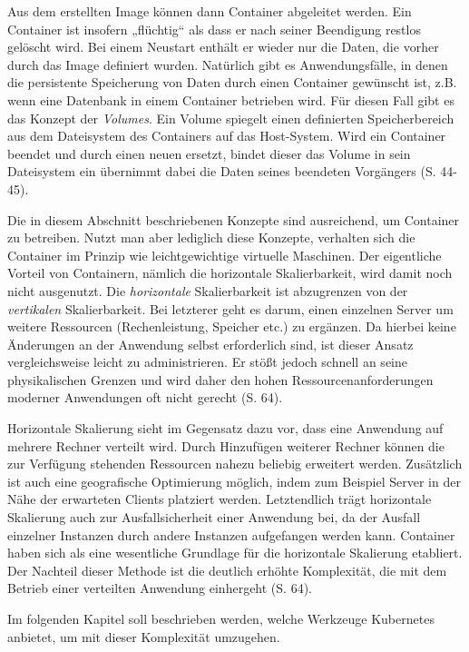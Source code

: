 \documentclass[11pt,a4paper]{article}
\begin{document}
Aus dem erstellten Image können dann Container abgeleitet werden. Ein Container ist insofern „flüchtig“ als dass er nach seiner
Beendigung restlos gelöscht wird. Bei einem Neustart enthält er wieder nur die Daten, die vorher durch das Image definiert wurden.
Natürlich gibt es Anwendungsfälle, in denen die persistente Speicherung von Daten durch einen Container gewünscht ist, z.B. wenn
eine Datenbank in einem Container betrieben wird. Für diesen Fall gibt es das Konzept der \emph{Volumes}.
Ein Volume spiegelt einen definierten Speicherbereich aus dem Dateisystem des Containers auf das Host-System.
Wird ein Container beendet und durch einen neuen ersetzt, bindet dieser das Volume in sein Dateisystem ein übernimmt
dabei die Daten seines beendeten Vorgängers \cite{kofler2021docker} (S. 44-45).

Die in diesem Abschnitt beschriebenen Konzepte sind ausreichend, um Container zu betreiben.
Nutzt man aber lediglich diese Konzepte, verhalten sich die Container im Prinzip wie leichtgewichtige virtuelle Maschinen.
Der eigentliche Vorteil von Containern, nämlich die horizontale Skalierbarkeit, wird damit noch nicht ausgenutzt.
Die \emph{horizontale} Skalierbarkeit ist abzugrenzen von der \emph{vertikalen} Skalierbarkeit.
Bei letzterer geht es darum, einen einzelnen Server um weitere Ressourcen (Rechenleistung, Speicher etc.) zu ergänzen.
Da hierbei keine Änderungen an der Anwendung selbst erforderlich sind, ist dieser Ansatz vergleichsweise leicht
zu administrieren. Er stößt jedoch schnell an seine physikalischen Grenzen und wird daher den hohen
Ressourcenanforderungen moderner Anwendungen oft nicht gerecht \cite{Schmeling_Dargatz_2022} (S. 64).

Horizontale Skalierung sieht im Gegensatz dazu vor, dass eine Anwendung
auf mehrere Rechner verteilt wird. Durch Hinzufügen weiterer Rechner können die zur Verfügung stehenden Ressourcen nahezu beliebig erweitert werden.
Zusätzlich ist auch eine geografische Optimierung möglich, indem zum Beispiel Server in der Nähe der erwarteten Clients platziert werden.
Letztendlich trägt horizontale Skalierung auch zur Ausfallsicherheit einer Anwendung bei, da der Ausfall einzelner Instanzen durch andere Instanzen
aufgefangen werden kann.
Container haben sich als eine wesentliche Grundlage für die horizontale Skalierung etabliert.
Der Nachteil dieser Methode ist die deutlich erhöhte Komplexität,
die mit dem Betrieb einer verteilten Anwendung einhergeht \cite{Schmeling_Dargatz_2022} (S. 64).

Im folgenden Kapitel soll beschrieben werden, welche Werkzeuge Kubernetes anbietet, um mit dieser Komplexität umzugehen.
\end{document}
